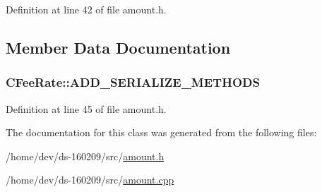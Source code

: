 Definition at line 42 of file amount.\+h.



\subsection{Member Data Documentation}
\hypertarget{class_c_fee_rate_ab1030f8a059eb5ccade1e3803bd727b3}{}
\subsubsection[{A\+D\+D\+\_\+\+S\+E\+R\+I\+A\+L\+I\+Z\+E\+\_\+\+M\+E\+T\+H\+O\+D\+S}]{\setlength{\rightskip}{0pt plus 5cm}C\+Fee\+Rate\+::\+A\+D\+D\+\_\+\+S\+E\+R\+I\+A\+L\+I\+Z\+E\+\_\+\+M\+E\+T\+H\+O\+D\+S}\label{class_c_fee_rate_ab1030f8a059eb5ccade1e3803bd727b3}


Definition at line 45 of file amount.\+h.



The documentation for this class was generated from the following files\+:\begin{DoxyCompactItemize}
\item 
/home/dev/ds-\/160209/src/\hyperlink{amount_8h}{amount.\+h}\item 
/home/dev/ds-\/160209/src/\hyperlink{amount_8cpp}{amount.\+cpp}\end{DoxyCompactItemize}
